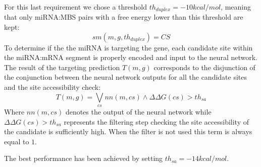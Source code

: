 For this last requirement we chose a threshold $th_{duplex} = -10kcal/mol$, meaning that only miRNA:MBS pairs with a free energy lower than this threshold are kept:
%
\begin{equation} \label{eq:eq1}
	sm(m,g, th_{duplex}) = CS
\end{equation}
To determine  if the the miRNA is targeting the gene, each candidate site within the miRNA:mRNA segment is properly encoded and input to the neural network. The result of the targeting prediction $T(m, g)$ corresponds to the disjunction of the conjunction between the neural network outputs for all the candidate sites and the site accessibility check:
%
\begin{equation} \label{eq:eq2}
	T(m,g) = \bigvee_{cs}{nn(m,cs) \wedge \Delta\Delta G(cs) > th_{sa}}
\end{equation} 
%
Where $nn(m,cs)$ denotes the output of the neural network while $\Delta\Delta G(cs) > th_{sa}$ represents the filtering step checking the site accessibility of the candidate is sufficiently high. When the filter is not used this term is always equal to $1$.

The best performance has been achieved by setting $th_{sa} = -14kcal/mol$.



